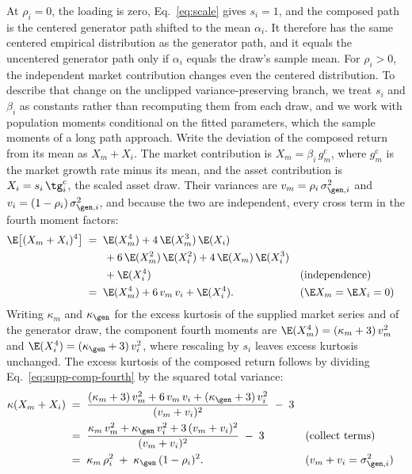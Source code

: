 At $\rho_i = 0$, the loading is zero, Eq.~\eqref{eq:scale} gives
$s_i = 1$, and the composed path is the centered generator path
shifted to the mean $\alpha_i$. It therefore has the same centered
empirical distribution as the generator path, and it equals the
uncentered generator path only if $\alpha_i$ equals the draw's sample
mean. For $\rho_i > 0$, the independent market contribution changes
even the centered distribution. To describe that change on the
unclipped variance-preserving branch, we treat $s_i$ and $\beta_i$ as
constants rather than recomputing them from each draw, and we work
with population moments conditional on the fitted parameters, which
the sample moments of a long path approach. Write the deviation of the
composed return from its mean as $X_m + X_i$. The market contribution
is $X_m = \beta_i\, g_m^{\mathrm c}$, where $g_m^{\mathrm c}$ is the
market growth rate minus its mean, and the asset contribution is
$X_i = s_i\, \tg_i^{\mathrm c}$, the scaled asset draw. Their variances
are $v_m = \rho_i\, \sigma_{\gen,i}^2$ and
$v_i = (1 - \rho_i)\, \sigma_{\gen,i}^2$, and because the two are
independent, every cross term in the fourth moment factors:
\begin{align}
  \E\big[(X_m + X_i)^4\big]
   &\;=\; \E(X_m^4) + 4\,\E(X_m^3)\,\E(X_i)
     \notag \\
   &\qquad + 6\,\E(X_m^2)\,\E(X_i^2)
     + 4\,\E(X_m)\,\E(X_i^3)
     \notag \\
   &\qquad + \E(X_i^4)
     && \text{(independence)} \notag \\
   &\;=\; \E(X_m^4) + 6\, v_m\, v_i + \E(X_i^4).
     && \text{($\E X_m = \E X_i = 0$)}
  \label{eq:supp-comp-fourth}
\end{align}
Writing $\kappa_m$ and $\kappa_{\gen}$ for the excess kurtosis of the
supplied market series and of the generator draw, the component
fourth moments are $\E(X_m^4) = (\kappa_m + 3)\, v_m^2$ and
$\E(X_i^4) = (\kappa_{\gen} + 3)\, v_i^2$, where rescaling by $s_i$
leaves excess kurtosis unchanged. The excess kurtosis of the composed
return follows by dividing Eq.~\eqref{eq:supp-comp-fourth} by the
squared total variance:
\begin{align}
  \kappa(X_m + X_i)
   &\;=\; \frac{(\kappa_m + 3)\, v_m^2 + 6\, v_m\, v_i
     + (\kappa_{\gen} + 3)\, v_i^2}{(v_m + v_i)^2} \;-\; 3
     \notag \\
   &\;=\; \frac{\kappa_m\, v_m^2 + \kappa_{\gen}\, v_i^2
     + 3\, (v_m + v_i)^2}{(v_m + v_i)^2} \;-\; 3
     && \text{(collect terms)} \notag \\
   &\;=\; \kappa_m\, \rho_i^2 \;+\; \kappa_{\gen}\, (1 - \rho_i)^2.
     && \text{($v_m + v_i = \sigma_{\gen,i}^2$)}
  \label{eq:supp-kurt-comp}
\end{align}
